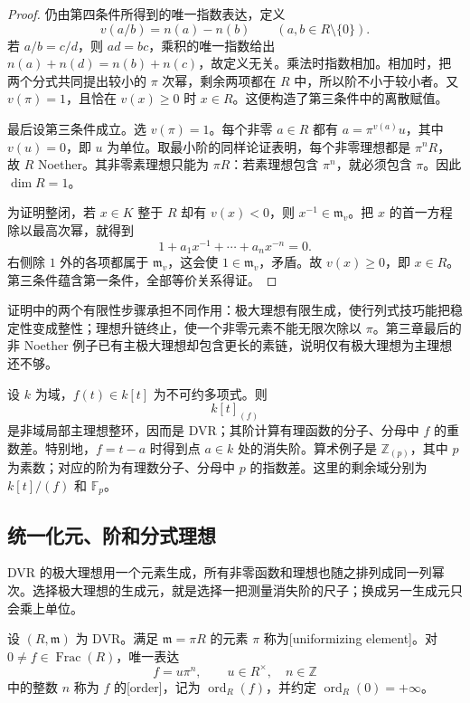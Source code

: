 \begin{proof}
	仍由第四条件所得到的唯一指数表达，定义
	\[
		v(a/b)=n(a)-n(b)\qquad(a,b\in R\setminus\{0\}).
	\]
	若 \(a/b=c/d\)，则 \(ad=bc\)，乘积的唯一指数给出 \(n(a)+n(d)=n(b)+n(c)\)，故定义无关。乘法时指数相加。相加时，把两个分式共同提出较小的 \(\pi\) 次幂，剩余两项都在 \(R\) 中，所以阶不小于较小者。又 \(v(\pi)=1\)，且恰在 \(v(x)\geq0\) 时 \(x\in R\)。这便构造了第三条件中的离散赋值。

	最后设第三条件成立。选 \(v(\pi)=1\)。每个非零 \(a\in R\) 都有 \(a=\pi^{v(a)}u\)，其中 \(v(u)=0\)，即 \(u\) 为单位。取最小阶的同样论证表明，每个非零理想都是 \(\pi^nR\)，故 \(R\) Noether。其非零素理想只能为 \(\pi R\)：若素理想包含 \(\pi^n\)，就必须包含 \(\pi\)。因此 \(\dim R=1\)。

	为证明整闭，若 \(x\in K\) 整于 \(R\) 却有 \(v(x)<0\)，则 \(x^{-1}\in\mathfrak m_v\)。把 \(x\) 的首一方程除以最高次幂，就得到
	\[
		1+a_1x^{-1}+\cdots+a_nx^{-n}=0.
	\]
	右侧除 \(1\) 外的各项都属于 \(\mathfrak m_v\)，这会使 \(1\in\mathfrak m_v\)，矛盾。故 \(v(x)\geq0\)，即 \(x\in R\)。第三条件蕴含第一条件，全部等价关系得证。
\end{proof}

证明中的两个有限性步骤承担不同作用：极大理想有限生成，使行列式技巧能把稳定性变成整性；理想升链终止，使一个非零元素不能无限次除以 \(\pi\)。第三章最后的非 Noether 例子已有主极大理想却包含更长的素链，说明仅有极大理想为主理想还不够。

\begin{example}
\label{g5:exm:basic-dvrs}
	设 \(k\) 为域，\(f(t)\in k[t]\) 为不可约多项式。则
	\[
		k[t]_{(f)}
	\]
	是非域局部主理想整环，因而是 DVR；其阶计算有理函数的分子、分母中 \(f\) 的重数差。特别地，\(f=t-a\) 时得到点 \(a\in k\) 处的消失阶。算术例子是 \(\mathbb Z_{(p)}\)，其中 \(p\) 为素数；对应的阶为有理数分子、分母中 \(p\) 的指数差。这里的剩余域分别为 \(k[t]/(f)\) 和 \(\mathbb F_p\)。
\end{example}

\subsection{统一化元、阶和分式理想}
\label{g5:subsec:0401:02}

DVR 的极大理想用一个元素生成，所有非零函数和理想也随之排列成同一列幂次。选择极大理想的生成元，就是选择一把测量消失阶的尺子；换成另一生成元只会乘上单位。

\begin{definition}
\label{g5:def:uniformizer}
	设 \((R,\mathfrak m)\) 为 DVR。满足 \(\mathfrak m=\pi R\) 的元素 \(\pi\) 称为[uniformizing element]。对 \(0\ne f\in\operatorname{Frac}(R)\)，唯一表达
	\[
		f=u\pi^n,\qquad u\in R^\times,\quad n\in\mathbb Z
	\]
	中的整数 \(n\) 称为 \(f\) 的[order]，记为 \(\operatorname{ord}_R(f)\)，并约定 \(\operatorname{ord}_R(0)=+\infty\)。
\end{definition}

